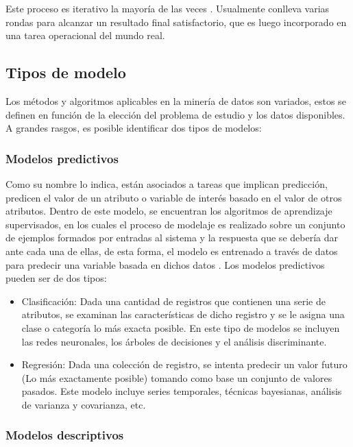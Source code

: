Este proceso es iterativo la mayoría de las veces . Usualmente conlleva varias rondas para alcanzar un resultado final satisfactorio, que es luego incorporado en una tarea operacional del mundo real. \cite{webmining}

\subsection{Tipos de modelo}

Los métodos y algoritmos aplicables en la minería de datos son variados, estos se definen en función de la elección del problema de estudio y los datos disponibles. A grandes rasgos, es posible identificar dos tipos de modelos:

\subsubsection{Modelos predictivos}

Como su nombre lo indica, están asociados a tareas que implican predicción, predicen el valor de un atributo o variable de interés basado en el valor de otros atributos. Dentro de este modelo, se encuentran los algoritmos de aprendizaje supervisados, en los cuales el proceso de modelaje es realizado sobre un conjunto de ejemplos formados por entradas al sistema y la respuesta que se debería dar ante cada una de ellas, de esta forma, el modelo es entrenado a través de datos para predecir una variable basada en dichos datos \cite{54}. Los modelos predictivos pueden ser de dos tipos:
 \begin{itemize}
 \item Clasificación: Dada una cantidad de registros que contienen una serie de atributos, se examinan las características de dicho registro y se le asigna una clase o categoría lo más exacta posible. En este tipo de modelos se incluyen las redes neuronales, los árboles de decisiones y el análisis discriminante.
 \item Regresión: Dada una colección de registro, se intenta predecir un valor futuro (Lo más exactamente posible) tomando como base un conjunto de valores pasados. Este modelo incluye series temporales, técnicas bayesianas, análisis de varianza y covarianza, etc.
 \end{itemize}

\subsubsection{Modelos descriptivos}

